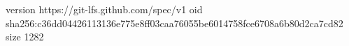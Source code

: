 version https://git-lfs.github.com/spec/v1
oid sha256:c36dd04426113136e775e8ff03caa76055be6014758fce6708a6b80d2ca7cd82
size 1282

